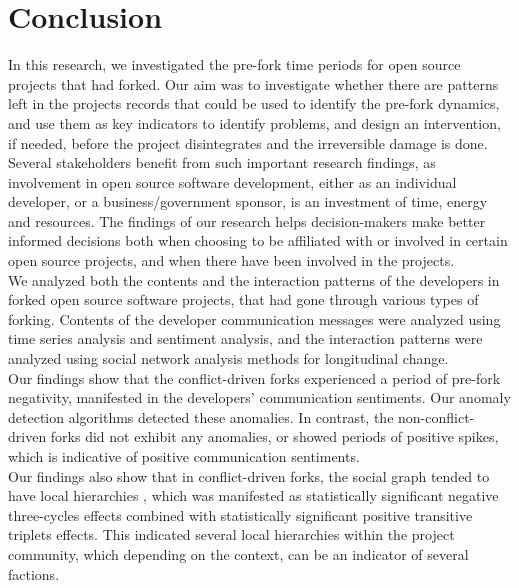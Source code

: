 \documentclass[12pt]{report}
\begin{document}
\pagebreak
\section{Conclusion}
\label{Discussion}

In this research, we investigated the pre-fork time periods for open source projects that had forked. Our aim was to investigate whether there are patterns left in the projects records that could be used to identify the pre-fork dynamics, and use them as key indicators to identify problems, and design an intervention, if needed, before the project disintegrates and the irreversible damage is done. \\

Several stakeholders benefit from such important research findings, as involvement in open source software development, either as an individual developer, or a business/government sponsor, is an investment of time, energy and resources. The findings of our research helps decision-makers make better informed decisions both when choosing to be affiliated with or involved in certain open source projects, and when there have been involved in the projects.\\

We analyzed both the contents and the interaction patterns of the developers in forked open source software projects, that had gone through various types of forking. Contents of the developer communication messages were analyzed using time series analysis and sentiment analysis, and the interaction patterns were analyzed using social network analysis methods for longitudinal change. \\

Our findings show that the conflict-driven forks experienced a period of pre-fork negativity, manifested in the developers' communication sentiments. Our anomaly detection algorithms detected these anomalies. In contrast, the non-conflict-driven forks did not exhibit any anomalies, or showed periods of positive spikes, which is indicative of positive communication sentiments. \\

Our findings also show that in conflict-driven forks, the social graph tended to have local hierarchies \cite{Snijders2010}, which was manifested as statistically significant negative three-cycles effects combined with statistically significant positive transitive triplets effects. This indicated several local hierarchies within the project community, which depending on the context, can be an indicator of several factions. \\ 
\end{document}
